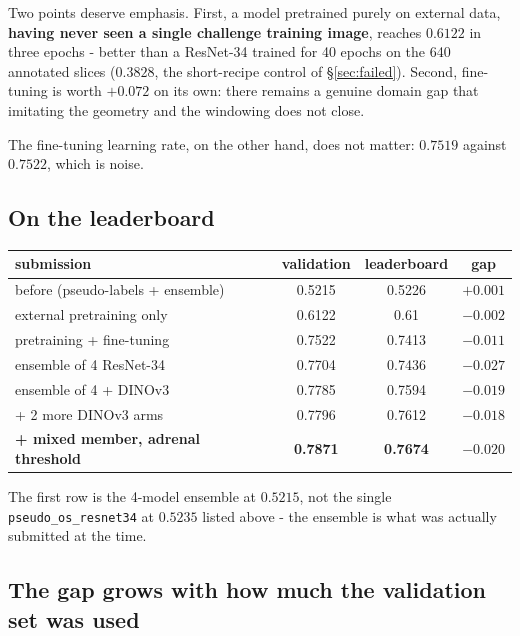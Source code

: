 \documentclass{article}
\begin{document}
\noindent Two points deserve emphasis. First, a model pretrained purely on external data,
\textbf{having never seen a single challenge training image}, reaches $0.6122$
in three epochs - better than a ResNet-34 trained for 40 epochs on the 640
annotated slices ($0.3828$, the short-recipe control of \S\ref{sec:failed}).
Second, fine-tuning is worth $+0.072$ on its own: there remains a genuine domain
gap that imitating the geometry and the windowing does not close.

\vspace{2.0mm}

\noindent The fine-tuning learning rate, on the other hand, does not matter: $0.7519$
against $0.7522$, which is noise.

\subsection{On the leaderboard}

\begin{center}
\begin{tabular}{lccc}
\hline
\textbf{submission} & \textbf{validation} & \textbf{leaderboard} & \textbf{gap} \\
\hline
before (pseudo-labels + ensemble) & 0.5215 & 0.5226 & $+0.001$ \\
external pretraining only & 0.6122 & 0.61 & $-0.002$ \\
pretraining + fine-tuning & 0.7522 & 0.7413 & $-0.011$ \\
ensemble of 4 ResNet-34 & 0.7704 & 0.7436 & $-0.027$ \\
ensemble of 4 + DINOv3 & 0.7785 & 0.7594 & $-0.019$ \\
+ 2 more DINOv3 arms & 0.7796 & 0.7612 & $-0.018$ \\
\textbf{+ mixed member, adrenal threshold} & \textbf{0.7871} & \textbf{0.7674} & $-0.020$ \\
\hline
\end{tabular}
\end{center}

The first row is the 4-model ensemble at $0.5215$, not the single
\texttt{pseudo\_os\_resnet34} at $0.5235$ listed above - the ensemble is what
was actually submitted at the time.

\subsection{The gap grows with how much the validation set was used}
\end{document}

